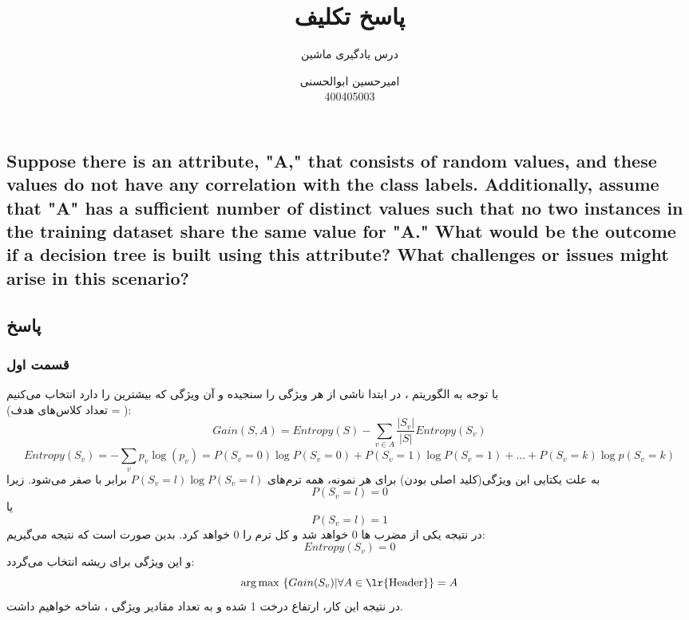 \documentclass{article}
\title{پاسخ تکلیف 
	\lr{Decision Tree (ID3)}
}
\author{درس یادگیری ماشین}
\date{
	امیرحسین ابوالحسنی\\
	400405003
	}
\DeclareMathOperator*{\argmax}{arg\,max}
\begin{document}
	\maketitle
	
	\begin{latin}
		\section{Suppose there is an attribute, "A," that consists of random values, and these
			values do not have any correlation with the class labels. Additionally, assume that
			"A" has a sufficient number of distinct values such that no two instances in the
			training dataset share the same value for "A." What would be the outcome if a
			decision tree is built using this attribute? What challenges or issues might arise in
			this scenario?}
	\end{latin}
	\noindent
	\subsection*{پاسخ}
	\subsubsection*{قسمت اول}
	با توجه به الگوریتم 
	،
	در ابتدا 
	ناشی از هر ویژگی را سنجیده و آن ویژگی که بیشترین 
	را دارد انتخاب می‌کنیم\\
	(تعداد کلاس‌های هدف = ):
	\[
	Gain(S, A) = Entropy(S) - \sum_{v \in A} \frac{| S_v |}{| S |}Entropy(S_v)
	\] 
	\[
	Entropy(S_v) = -\sum_{v} p_v\log (p_v) = P(S_v = 0) \log P(S_v = 0) + P(S_v = 1) \log P(S_v = 1) + \dots‌+ P(S_v = k) \log p(S_v = k)
	\]
	به علت یکتایی این ویژگی(کلید اصلی بودن) برای هر نمونه، همه ترم‌های $P(S_v = l) \log P(S_v = l)$ برابر با صفر می‌شود.  زیرا 
	\[
	P(S_v = l) = 0
	\]
	یا
	\[
	P(S_v = l) = 1
	\]
	 در نتیجه یکی از مضرب ها 0 خواهد شد و کل ترم‌ را 0 خواهد کرد. بدین صورت است که نتیجه می‌گیریم:
	\[
	Entropy(S_v) = 0
	\]
	و این ویژگی برای ریشه انتخاب می‌گردد:
	\[
	\argmax ~ \{Gain(S_v) |\forall A \in \text{\lr{Header}}\} = A
	\]
	در نتیجه این کار، ارتفاع درخت 1 شده و به تعداد مقادیر ویژگی 
	،
شاخه خواهیم داشت.
	
\end{document}

